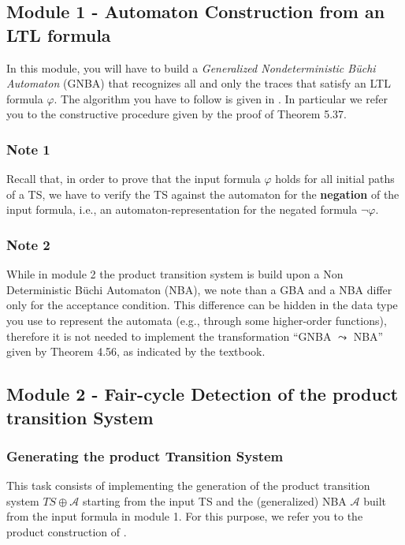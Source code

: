 \documentclass{article}
\begin{document}
\subsection{Module 1 - Automaton Construction from an LTL formula}
\label{subsec-m1}
In this module, you will have to build a \emph{Generalized Nondeterministic Büchi Automaton} (GNBA) 
that recognizes all and only the traces that satisfy an LTL formula $\varphi$. The algorithm you have to follow 
is given in \cite[Paragraph 5.2]{BaKa}. 
In particular we refer you to the constructive procedure given by the proof of Theorem 5.37.


\subsubsection*{Note 1}
Recall that, in order to prove that the input formula $\varphi$ holds for all initial paths of a TS, we have 
to verify the TS against the automaton for the \textbf{negation} of the input formula, i.e., an automaton-representation 
for the negated formula $\neg \varphi$.

\subsubsection*{Note 2}
While in module 2 the product transition system is build upon a Non Deterministic Büchi Automaton (NBA), we note 
than a GBA and a NBA differ only for the acceptance condition. This difference can be hidden in the 
data type you use to represent the automata (e.g., through some higher-order functions), 
therefore it is not needed to implement the transformation ``GNBA $\leadsto$ NBA'' given by Theorem 4.56, as indicated 
by the textbook.

\subsection{Module 2 - Fair-cycle Detection of the product transition System}
\label{subsec-m2}
\subsubsection*{Generating the product Transition System}
This task consists of implementing the generation of the product transition system $TS \oplus \mathcal{A}$
starting from the input TS and the (generalized) NBA $\mathcal{A}$ built from the input formula in module 1.
For this purpose, we refer you to the product construction of \cite[Section 4.4.1]{BaKa}.
\end{document}
